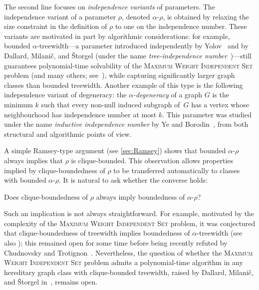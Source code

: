 \documentclass[11pt]{article}
\theoremstyle{plain}
\theoremstyle{definition}
\theoremstyle{remark}
\numberwithin{equation}{section}
\begin{document}
The second line focuses on \emph{independence variants} of parameters.
The independence variant of a parameter $\rho$, denoted $\alpha$-$\rho$, is obtained by relaxing the size constraint in the definition of $\rho$ to one on the independence number.
These variants are motivated in part by algorithmic considerations: for example, bounded $\alpha$-treewidth---a parameter introduced independently by Yolov~\cite{MR3775804} and by Dallard, Milani{\v c}, and {\v S}torgel (under the name \emph{tree-independence number}~\cite{dallard2022firstpaper,dallard2022secondpaper})---still guarantees polynomial-time solvability of the \textsc{Maximum Weight Independent Set} problem (and many others; see~\cite{DFGKM25,MR3775804,LMMORS24,dallard2022firstpaper,MR4640320}), while capturing significantly larger graph classes than bounded treewidth.
Another example of this type is the following independence variant of degeneracy: the \emph{$\alpha$-degeneracy} of a graph $G$ is the minimum $k$ such that every non-null induced subgraph of~$G$ has a vertex whose neighbourhood has independence number at most $k$.
This parameter was studied under the name \emph{inductive independence number} by Ye and Borodin~\cite{MR2916349}, from both structural and algorithmic points of view.

A simple Ramsey-type argument (see \cref{sec:Ramsey}) shows that bounded $\alpha$-$\rho$ always implies that $\rho$ is clique-bounded. 
This observation allows properties implied by clique-boundedness of $\rho$ to be transferred automatically to classes with bounded $\alpha$-$\rho$.  
It is natural to ask whether the converse holds: 

\begin{center}
Does clique-boundedness of $\rho$ always imply boundedness of $\alpha$-$\rho$?
\end{center}
Such an implication is not always straightforward.
For example, motivated by the complexity of the \textsc{Maximum Weight Independent Set} problem, it was conjectured that clique-boundedness of treewidth implies boundedness of $\alpha$-treewidth \cite{dallard2022secondpaper} (see also \cite{MR4334541}); this remained open for some time before being recently refuted by Chudnovsky and Trotignon~\cite{CT24}.
Nevertheless, the question of whether the \textsc{Maximum Weight Independent Set} problem admits a polynomial-time algorithm in any hereditary graph class with clique-bounded treewidth, raised by Dallard, Milani{\v c}, and {\v S}torgel in~\cite{MR4334541,dallard2022secondpaper}, remains open.
\end{document}
